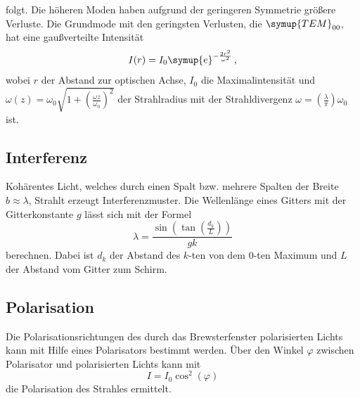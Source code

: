 folgt. Die höheren Moden haben aufgrund der geringeren Symmetrie größere Verluste.
Die Grundmode  mit den geringsten Verlusten, die $\symup{TEM}_{00}$, hat eine gaußverteilte Intensität
\begin{equation}
    I(r) = I_0 \symup{e}^{-\frac{2r^2}{\omega^2}} \, \text{,}
    \label{eqn:tem00}
\end{equation}
wobei $r$ der Abstand zur optischen Achse, $I_0$ die Maximalintensität
und $\omega(z) = \omega_0 \sqrt{1+(\frac{\omega z}{\omega_0})^2}$ der Strahlradius mit der Strahldivergenz $\omega = (\frac{\lambda}{\pi}) \omega_0$ ist.
\FloatBarrier

\subsection{Interferenz}
Kohärentes Licht, welches durch einen Spalt bzw. mehrere Spalten der Breite $b \approx \lambda$, Strahlt erzeugt Interferenzmuster.
Die Wellenlänge eines Gitters mit der Gitterkonstante $g$ lässt sich mit der Formel
\begin{equation}
    \lambda = \frac{\sin(\tan(\frac{d_k}{L}))}{g k}
    \label{eqn:gitter}
\end{equation}
berechnen. Dabei ist $d_k$ der Abstand des $k$-ten von dem $0$-ten Maximum und $L$ der Abstand vom Gitter zum Schirm.

\subsection{Polarisation}
Die Polarisationsrichtungen des durch das Brewsterfenster polarisierten Lichts kann mit Hilfe eines Polarisators bestimmt werden.
Über den Winkel $\varphi$ zwischen Polarisator und polarisierten Lichts kann mit
\begin{equation}
    I = I_0 \cos^2(\varphi)
    \label{eqn:polar}
\end{equation}
die Polarisation des Strahles ermittelt.\cite{leifi}
